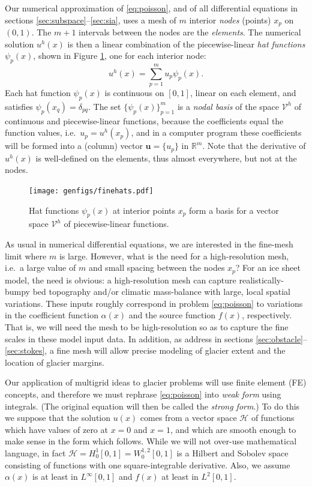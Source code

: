 \documentclass[letterpaper,final,12pt,reqno]{amsart}
\theoremstyle{claim}
\newcommand{\RR}{\mathbb{R}}
\newcommand{\bu}{\mathbf{u}}
\numberwithin{equation}{section}
\numberwithin{figure}{section}
\numberwithin{table}{section}
\numberwithin{theorem}{section}
\begin{document}
Our numerical approximation of \eqref{eq:poisson}, and of all differential equations in sections \ref{sec:subspace}--\ref{sec:sia}, uses a mesh of $m$ interior \emph{nodes} (points) $x_p$ on $(0,1)$.  The $m+1$ intervals between the nodes are the \emph{elements}.  The numerical solution $u^h(x)$ is then a linear combination of the piecewise-linear \emph{hat functions} $\psi_p(x)$, shown in Figure \ref{fig:finehats}, one for each interior node:
\begin{equation}
u^h(x) = \sum_{p=1}^m u_p \psi_p(x). \label{eq:trialsolution}
\end{equation}
Each hat function $\psi_p(x)$ is continuous on $[0,1]$, linear on each element, and satisfies $\psi_p(x_q) = \delta_{pq}$.  The set $\{\psi_p(x)\}_{p=1}^m$ is a \emph{nodal basis} of the space $\mathcal{V}^h$ of continuous and piecewise-linear functions, because the coefficients equal the function values, i.e.~$u_p=u^h(x_p)$, and in a computer program these coefficients will be formed into a (column) vector $\bu=\{u_p\}$ in $\RR^m$.  Note that the derivative of $u^h(x)$ is well-defined on the elements, thus almost everywhere, but not at the nodes.

\begin{figure}
\texttt{[image: genfigs/finehats.pdf]}
\caption{Hat functions $\psi_p(x)$ at interior points $x_p$ form a basis for a vector space $\mathcal{V}^h$ of piecewise-linear functions.}
\label{fig:finehats}
\end{figure}

As usual in numerical differential equations, we are interested in the fine-mesh limit where $m$ is large.  However, what is the need for a high-resolution mesh, i.e.~a large value of $m$ and small spacing between the nodes $x_p$?  For an ice sheet model, the need is obvious: a high-resolution mesh can capture realistically-bumpy bed topography and/or climatic mass-balance with large, local spatial variations.  These inputs roughly correspond in problem \eqref{eq:poisson} to variations in the coefficient function $\alpha(x)$ and the source function $f(x)$, respectively.  That is, we will need the mesh to be high-resolution so as to capture the fine scales in these model input data.  In addition, as address in sections \ref{sec:obstacle}--\ref{sec:stokes}, a fine mesh will allow precise modeling of glacier extent and the location of glacier margins.

Our application of multigrid ideas to glacier problems will use finite element (FE) concepts, and therefore we must rephrase \eqref{eq:poisson} into \emph{weak form} using integrals.  (The original equation will then be called the \emph{strong form}.)  To do this we suppose that the solution $u(x)$ comes from a vector space $\mathcal{H}$ of functions which have values of zero at $x=0$ and $x=1$, and which are smooth enough to make sense in the form which follows.  While we will not over-use mathematical language, in fact $\mathcal{H}=H_0^1[0,1]=W_0^{1,2}[0,1]$ is a Hilbert and Sobolev space \cite[for example]{Evans2010} consisting of functions with one square-integrable derivative.  Also, we assume $\alpha(x)$ is at least in $L^\infty[0,1]$ and $f(x)$ at least in $L^2[0,1]$.
\end{document}

